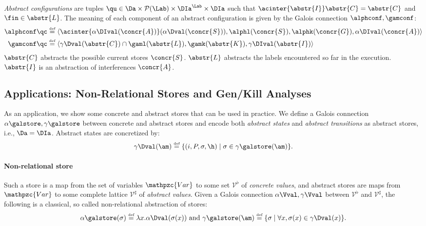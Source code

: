 \documentclass[12pt]{article}
\let\firstinter\cap
\let\cap\firstinter
\newcommand{\egdef}{\stackrel{\text{\tiny def}}{=}}
\let\n\newcommand
\renewcommand{\wp}{\mathcal{P}}
\newcounter{labels}[figure]
\newcommand{\va}{\mathpzc{Var}} \newcommand{\m}{\sigma} \n{\D}{\wp(\St)}
\newcommand{\fleche}{\mapsto}
\newcommand{\func}[2]{\lambda #1. #2 } \newcommand{\fx}[3]{#1[#2 \fleche #3]} \newcommand{\nf}[3]{#1\smallsetminus[#2 \fleche #3]}  \newcommand{\ndf}[2]{#1(#2)\uparrow}
\begin{document}
\emph{Abstract configurations} are tuples \(\qu \in \Da \times \wp(\Lab) \times  \DIa^{\Lab} \times \DIa \) such that \(\acinter{\abstr{I}}\abstr{C}=\abstr{C}\) and \(\fin\in\abstr{L}\). 
The meaning of each component of an abstract configuration is given by the Galois connection \(\alphconf,\gamconf\):
 \begin{align*}
  \alphconf \qc &\egdef \langle\acinter{\alpha\DIval(\concr{A})}(\alpha\Dval (\concr{S})), \alphl(\concr{S}),\alphk(\concr{G}),\alpha\DIval(\concr{A})  \rangle\\
  \gamconf \qc &\egdef \langle\gamma\Dval (\abstr{C})\cap\gaml(\abstr{L}),
\gamk(\abstr{K}),\gamma\DIval(\abstr{I})  \rangle
 \end{align*}
\(\abstr{C}\) abstracts the possible current stores \(\concr{S}\). \(\abstr{L}\) abstracts the labels encountered so far in the execution. \(\abstr{I}\) is an abstraction of interferences \(\concr{A}\).

\subsection{Applications: Non-Relational Stores and Gen/Kill Analyses}\label{sec:nonrelational}

As an application, we show
some concrete and abstract stores that can be used in practice. We define a Galois connection \(\alpha\galstore,\gamma\galstore\) between concrete and abstract stores and encode both \emph{abstract states} and \emph{abstract transitions} as abstract stores, i.e., \(\Da=\DIa\). Abstract states are concretized by: \[\gamma\Dval(\am)\egdef\{(i,P,\m,\h) \mid  \m\in\gamma\galstore(\am) \}.\]

\paragraph{Non-relational store} Such a store is a map from the set of variables \(\va\) to some set \(\mathcal{V}^{\flat}\) of \emph{concrete values}, and abstract stores are maps from \(\va\) to some complete lattice \(\mathcal{V}^{\sharp}\) of \emph{abstract values}. Given a Galois connection \(\alpha\Vval,\gamma\Vval\) between \(\mathcal{V}^{\flat}\) and \(\mathcal{V}^{\sharp}\), the following is a classical, so called non-relational abstraction of stores:
\[\alpha\galstore (\m) \egdef \func{x}{\alpha\Dval(\m(x))}\text{ and }\gamma\galstore (\am) \egdef \{\m \mid  \forall x, \m(x) \in \gamma\Dval (x)\}.\]
\end{document}
